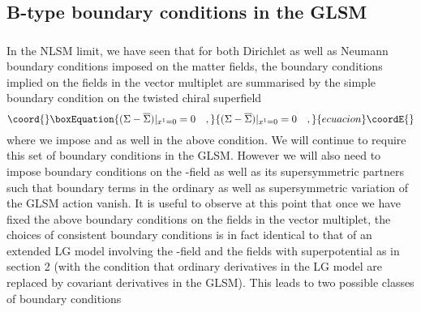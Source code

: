 \documentclass[a4paper,12pt]{article}
\begin{document}
\subsection{B-type boundary conditions in the GLSM}

\subsubsection{\coordHE{}}

In the NLSM limit, we have seen that for both Dirichlet as well as Neumann
boundary conditions imposed on the matter fields, the boundary
conditions implied on the fields in the vector multiplet are summarised
by the simple boundary condition on the twisted chiral superfield
\begin{equation}\coord{}\boxEquation{
(\Sigma - \overline{\Sigma})|_{x^1=0} =0\quad,
}{
(\Sigma - \overline{\Sigma})|_{x^1=0} =0\quad,
}{ecuacion}\coordE{}\end{equation}
where we impose \myHighlight{$\theta^+=\eta\theta^-$}\coordHE{} and
\myHighlight{$\overline{\theta}^+=\eta\overline{\theta}^-$}\coordHE{} as well in the above condition.
We will continue to require this set of boundary conditions in the
GLSM. However we will also need to impose boundary  conditions on
the \coordHE{}-field as well as its supersymmetric partners \coordHE{}
such that boundary terms in the ordinary as well as supersymmetric
variation of the GLSM action vanish. 
It is useful to observe at this point that once we
have fixed the above boundary conditions on the fields in the vector
multiplet, the choices of consistent boundary conditions is in fact
identical to that of an extended LG model involving the \coordHE{}-field
and the fields \coordHE{} with superpotential \coordHE{}
as in section 2 (with the condition that ordinary
derivatives in the LG model  are replaced by covariant derivatives
in the GLSM).  This leads to two possible classes of boundary conditions 
\end{document}
